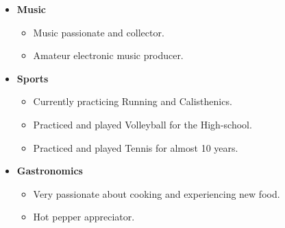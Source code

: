 \documentclass[11pt,a4paper,sans]{moderncv}        %
\begin{document}
\begin{itemize}

\item{\textbf{Music} 
\begin{itemize} 
\item Music passionate and collector.
\item Amateur electronic music producer.
\end{itemize}}

\vspace{1pt}
\item{\textbf{Sports}
\begin{itemize} 
\item Currently practicing Running and Calisthenics.
\item Practiced and played Volleyball for the High-school.
\item Practiced and played Tennis for almost 10 years.
\end{itemize}}

\item{\textbf{Gastronomics}
\begin{itemize} 
\item Very passionate about cooking and experiencing new food.
\item Hot pepper appreciator. 
\end{itemize}}





\end{itemize}

\nocite{*}



\end{document}
